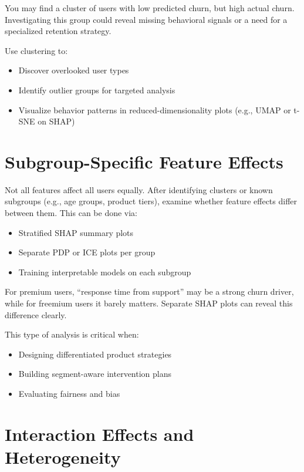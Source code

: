 \documentclass[12pt,openany]{book}
\begin{document}
\begin{examplebox}
You may find a cluster of users with low predicted churn, but high actual churn. Investigating this group could reveal missing behavioral signals or a need for a specialized retention strategy.
\end{examplebox}

Use clustering to:
\begin{itemize}
  \item Discover overlooked user types
  \item Identify outlier groups for targeted analysis
  \item Visualize behavior patterns in reduced-dimensionality plots (e.g., UMAP or t-SNE on SHAP)
\end{itemize}



\section{Subgroup-Specific Feature Effects}

Not all features affect all users equally. After identifying clusters or known subgroups (e.g., age groups, product tiers), examine whether feature effects differ between them. This can be done via:
\begin{itemize}
  \item Stratified SHAP summary plots
  \item Separate PDP or ICE plots per group
  \item Training interpretable models on each subgroup
\end{itemize}

\begin{examplebox}
For premium users, ``response time from support'' may be a strong churn driver, while for freemium users it barely matters. Separate SHAP plots can reveal this difference clearly.
\end{examplebox}

This type of analysis is critical when:
\begin{itemize}
  \item Designing differentiated product strategies
  \item Building segment-aware intervention plans
  \item Evaluating fairness and bias
\end{itemize}

\section{Interaction Effects and Heterogeneity}
\end{document}

